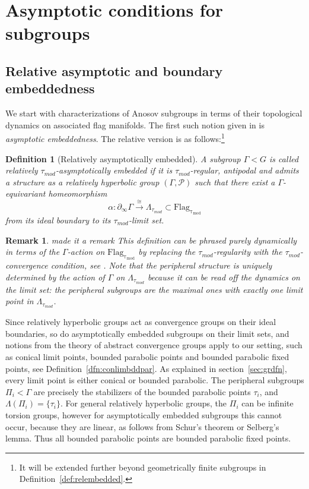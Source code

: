 \documentclass[12pt]{article}
\theoremstyle{boldplain}
\theoremstyle{bolddefinition}
\newtheorem{definition}[equation]{Definition}
\newtheorem{rem}[equation]{Remark}
\numberwithin{equation}{section}
\def\al{\alpha}
\def\Ga{\Gamma}
\def\La{\Lambda}
\def\Flagt{\operatorname{Flag_{\tau_{mod}}}}
\def\geo{\partial_{\infty}}
\def\Lat{\La_{\tau_{mod}}}
\def\lra{\longrightarrow}
\def\taumod{\tau_{mod}}
\def\mini{\scriptsize}
\begin{document}
\section{Asymptotic conditions for subgroups}
\label{sec:BM}


\subsection{Relative asymptotic and boundary embeddedness}
\label{sec:hrbm}

We start with characterizations of Anosov subgroups in terms of their topological dynamics on associated flag manifolds. 
The first such notion given in \cite[Def.~5.12]{anolec} is {\em asymptotic embeddedness}.
The relative version is as follows:\footnote{It will be extended further beyond geometrically finite subgroups in Definition~\ref{def:relembedded}.}

\begin{definition}[Relatively asymptotically embedded]
\label{def:relasembedded}
A subgroup $\Ga<G$ is called {\em relatively $\taumod$-asymptotically embedded} 
if it is $\taumod$-regular, antipodal and 
admits a structure as a relatively hyperbolic group $(\Ga,{\mathcal P})$
such that there exist a $\Ga$-equivariant homeomorphism
$$ \al:\geo\Ga \stackrel{\cong}{\lra} \Lat \subset\Flagt $$
from its ideal boundary to its $\taumod$-limit set.
\end{definition}

\begin{rem}\label{rem:RAE}
{\mini made it a remark} 
This definition can be phrased purely dynamically in terms of the $\Ga$-action on $\Flagt$
by replacing the $\taumod$-regularity with the $\taumod$-convergence condition, see \cite{anolec}.
Note that 
the peripheral structure is uniquely determined {by the action of $\Ga$ on $\Lat$}  
because it can be read off the dynamics on the limit set: 
the peripheral subgroups are the maximal ones with exactly one limit point in $\Lat$.\end{rem}

Since relatively hyperbolic groups act as convergence groups on their ideal boundaries,
so do asymptotically embedded subgroups on their limit sets,
and notions from the theory of abstract convergence groups apply to our setting,
such as conical limit points, bounded parabolic points and bounded parabolic fixed points,
see Definition~\ref{dfn:conlimbddpar}.
As explained in section~\ref{sec:grdfn}, 
every limit point is either conical or bounded parabolic.
The peripheral subgroups $\Pi_i< \Ga$ are precisely the 
stabilizers of the bounded parabolic points $\tau_i$, 
and $\La(\Pi_i)=\{\tau_i\}$. 
For general relatively hyperbolic groups, the $\Pi_i$ can be infinite torsion groups,
however for asymptotically embedded subgroups this cannot occur, because they are linear,
as follows from Schur's theorem or Selberg's lemma. 
Thus all bounded parabolic points are bounded parabolic fixed points. 
\end{document}
